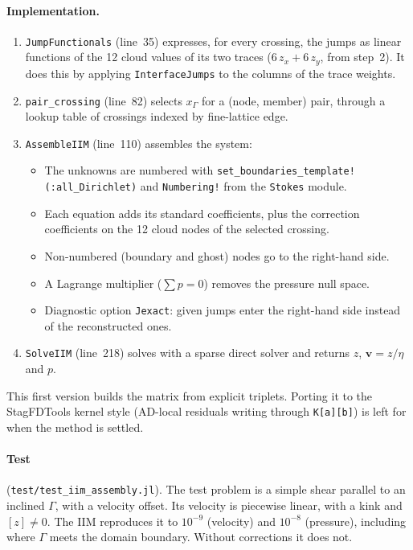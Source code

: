 \documentclass[11pt,a4paper]{article}
\newcommand{\code}[1]{\texttt{#1}}
\begin{document}
\paragraph{Implementation.}
\begin{enumerate}[leftmargin=*]
\item \code{JumpFunctionals} (line~35) expresses, for every crossing, the jumps as linear
  functions of the 12 cloud values of its two traces ($6\,z_x+6\,z_y$, from step~2). It does
  this by applying \code{InterfaceJumps} to the columns of the trace weights.
\item \code{pair\_crossing} (line~82) selects $x_\Gamma$ for a (node, member) pair, through a
  lookup table of crossings indexed by fine-lattice edge.
\item \code{AssembleIIM} (line~110) assembles the system:
  \begin{itemize}
    \item The unknowns are numbered with \code{set\_boundaries\_template!(:all\_Dirichlet)} and
      \code{Numbering!} from the \code{Stokes} module.
    \item Each equation adds its standard coefficients, plus the correction coefficients on the
      12 cloud nodes of the selected crossing.
    \item Non-numbered (boundary and ghost) nodes go to the right-hand side.
    \item A Lagrange multiplier ($\sum p=0$) removes the pressure null space.
    \item Diagnostic option \code{Jexact}: given jumps enter the right-hand side instead of
      the reconstructed ones.
  \end{itemize}
\item \code{SolveIIM} (line~218) solves with a sparse direct solver and returns $z$,
  $\mathbf v=z/\eta$ and $p$.
\end{enumerate}
This first version builds the matrix from explicit triplets. Porting it to the StagFDTools
kernel style (AD-local residuals writing through \code{K[a][b]}) is left for when the method is
settled.

\paragraph{Test} (\code{test/test\_iim\_assembly.jl}). The test problem is a simple shear
parallel to an inclined $\Gamma$, with a velocity offset. Its velocity is piecewise linear, with
a kink and $[z]\neq0$. The IIM reproduces it to $10^{-9}$ (velocity) and $10^{-8}$ (pressure),
including where $\Gamma$ meets the domain boundary. Without corrections it does not.
\end{document}
